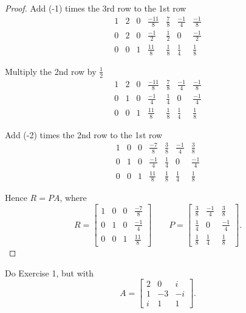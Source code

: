 \begin{proof}
    Add (-1) times the 3rd row to the 1st row
    \[
        \begin{array}{cccc|ccc}
            1 & 2 & 0 & \frac{-11}{8} & \frac{7}{8} & \frac{-1}{4} & \frac{-1}{8} \\
            0 & 2 & 0 & \frac{-1}{2}  & \frac{1}{2} & 0            & \frac{-1}{2} \\
            0 & 0 & 1 & \frac{11}{8}  & \frac{1}{8} & \frac{1}{4}  & \frac{1}{8}
        \end{array}
    \]

    Multiply the 2nd row by $\frac{1}{2}$
    \[
        \begin{array}{cccc|ccc}
            1 & 2 & 0 & \frac{-11}{8} & \frac{7}{8} & \frac{-1}{4} & \frac{-1}{8} \\
            0 & 1 & 0 & \frac{-1}{4}  & \frac{1}{4} & 0            & \frac{-1}{4} \\
            0 & 0 & 1 & \frac{11}{8}  & \frac{1}{8} & \frac{1}{4}  & \frac{1}{8}
        \end{array}
    \]

    Add (-2) times the 2nd row to the 1st row
    \[
        \begin{array}{cccc|ccc}
            1 & 0 & 0 & \frac{-7}{8} & \frac{3}{8} & \frac{-1}{4} & \frac{3}{8}  \\
            0 & 1 & 0 & \frac{-1}{4} & \frac{1}{4} & 0            & \frac{-1}{4} \\
            0 & 0 & 1 & \frac{11}{8} & \frac{1}{8} & \frac{1}{4}  & \frac{1}{8}
        \end{array}
    \]

    Hence $R = PA$, where
    \[
        R = \begin{bmatrix}
            1 & 0 & 0 & \frac{-7}{8} \\
            0 & 1 & 0 & \frac{-1}{4} \\
            0 & 0 & 1 & \frac{11}{8}
        \end{bmatrix}
        \qquad
        P = \begin{bmatrix}
            \frac{3}{8} & \frac{-1}{4} & \frac{3}{8}  \\
            \frac{1}{4} & 0            & \frac{-1}{4} \\
            \frac{1}{8} & \frac{1}{4}  & \frac{1}{8}
        \end{bmatrix}.
    \]
\end{proof}

\begin{exercise}
    Do Exercise 1, but with
    \[
        A = \begin{bmatrix}
            2 & 0  & i  \\
            1 & -3 & -i \\
            i & 1  & 1
        \end{bmatrix}.
    \]
\end{exercise}

